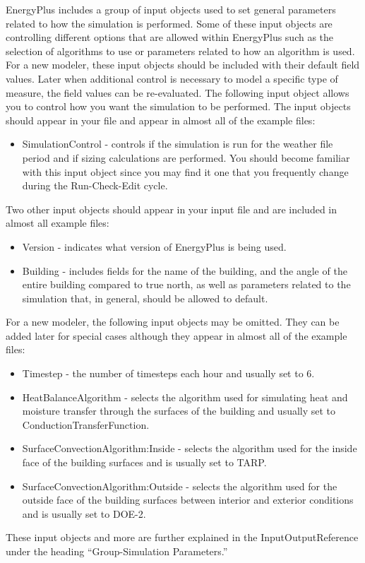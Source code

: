 EnergyPlus includes a group of input objects used to set general parameters
related to how the simulation is performed. Some of these input objects
are controlling different options that are allowed within EnergyPlus
such as the selection of algorithms to use or parameters related to
how an algorithm is used. For a new modeler, these input objects should
be included with their default field values. Later when additional
control is necessary to model a specific type of measure, the field
values can be re-evaluated. The following input object allows you
to control how you want the simulation to be performed. The input
objects should appear in your file and appear in almost all of the
example files:
\begin{itemize}
\item SimulationControl - controls if the simulation is run for the weather
file period and if sizing calculations are performed. You should become
familiar with this input object since you may find it one that you
frequently change during the Run-Check-Edit cycle.
\end{itemize}
Two other input objects should appear in your input file and are included
in almost all example files:
\begin{itemize}
\item Version - indicates what version of EnergyPlus is being used.
\item Building - includes fields for the name of the building, and the angle
of the entire building compared to true north, as well as parameters
related to the simulation that, in general, should be allowed to default.
\end{itemize}
For a new modeler, the following input objects may be omitted. They
can be added later for special cases although they appear in
almost all of the example files:
\begin{itemize}
\item Timestep - the number of timesteps each hour and usually set to 6.
\item HeatBalanceAlgorithm - selects the algorithm used for simulating heat
and moisture transfer through the surfaces of the building and usually
set to ConductionTransferFunction.
\item SurfaceConvectionAlgorithm:Inside - selects the algorithm used for
the inside face of the building surfaces and is usually set to TARP.
\item SurfaceConvectionAlgorithm:Outside - selects the algorithm used for
the outside face of the building surfaces between interior and exterior
conditions and is usually set to DOE-2.
\end{itemize}
These input objects and more are further explained in the InputOutputReference
under the heading ``Group-Simulation Parameters.''


